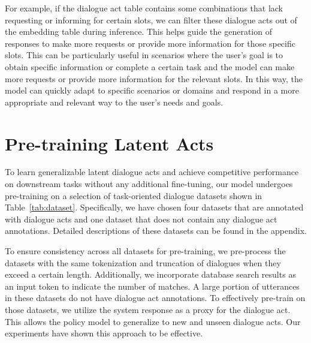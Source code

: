 For example, if the dialogue act table contains some combinations that lack requesting or informing for certain slots, we can filter these dialogue acts out of the embedding table during inference. 
This helps guide the generation of responses to make more requests or provide more information for those specific slots. This can be particularly useful in scenarios where the user's goal is to obtain specific information or complete a certain task and the model can make more requests or provide more information for the relevant slots. 
In this way, the model can quickly adapt to specific scenarios or domains and respond in a more appropriate and relevant way to the user's needs and goals.

\section{Pre-training Latent Acts}

\begin{table}[h]
    \centering
    \caption{Pre-training datasets statistics. For datasets without dialogue act labels, we use system responses as a proxy for the dialogue act.}
    \label{tab:dataset}
\end{table}

To learn generalizable latent dialogue acts and achieve competitive performance on downstream tasks without any additional fine-tuning, our model undergoes pre-training on a selection of task-oriented dialogue datasets shown in Table~\ref{tab:dataset}.
Specifically, we have chosen four datasets that are annotated with dialogue acts and one dataset that does not contain any dialogue act annotations. 
Detailed descriptions of these datasets can be found in the appendix.

To ensure consistency across all datasets for pre-training, we pre-process the datasets with the same tokenization and truncation of dialogues when they exceed a certain length. 
Additionally, we incorporate database search results as an input token to indicate the number of matches.
A large portion of utterances in these datasets do not have dialogue act annotations.
To effectively pre-train on those datasets, we utilize the system response as a proxy for the dialogue act. 
This allows the policy model to generalize to new and unseen dialogue acts. 
Our experiments have shown this approach to be effective.

